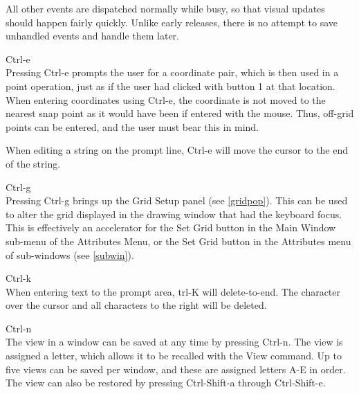 \begin{description}
All other events are dispatched normally while busy, so that
visual updates should happen fairly quickly.  Unlike early
releases, there is no attempt to save unhandled events and handle
them later.

\item{\kb Ctrl-e}\\
Pressing {\kb Ctrl-e} prompts the user for a coordinate pair, which is
then used in a point operation, just as if the user had clicked with
button 1 at that location.  When entering coordinates using {\kb
Ctrl-e}, the coordinate is not moved to the nearest snap point as it
would have been if entered with the mouse.  Thus, off-grid points can
be entered, and the user must bear this in mind.

When editing a string on the prompt line, {\kb Ctrl-e} will move the
cursor to the end of the string. 

\item{\kb Ctrl-g}\\
Pressing {\kb Ctrl-g} brings up the {\cb Grid Setup} panel (see
\ref{gridpop}).  This can be used to alter the grid displayed in the
drawing window that had the keyboard focus.  This is effectively an
accelerator for the {\cb Set Grid} button in the {\cb Main Window}
sub-menu of the {\cb Attributes Menu}, or the {\cb Set Grid} button
in the {\cb Attributes} menu of sub-windows (see \ref{subwin}).

\item{\kb Ctrl-k}\\
When entering text to the prompt area, {\kb trl-K} will delete-to-end. 
The character over the cursor and all characters to the right will be
deleted.

\item{\kb Ctrl-n}\\
The view in a window can be saved at any time by pressing {\kb
Ctrl-n}.  The view is assigned a letter, which allows it to be
recalled with the {\cb View} command.  Up to five views can be saved
per window, and these are assigned letters A-E in order.  The view can
also be restored by pressing {\kb Ctrl-Shift-a} through {\kb
Ctrl-Shift-e}.


\end{description}
